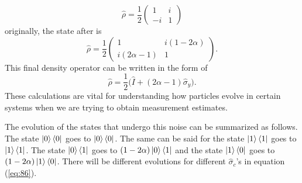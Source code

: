 \documentclass[twocolumn]{article}
\begin{document}
\begin{equation} \label{eq:90}
\hat{\rho}=\frac{1}{2}
\begin{pmatrix}
1 & i \\
-i & 1
\end{pmatrix}
\end{equation}
originally, the state after is
\begin{equation} \label{eq:91}
\hat{\rho}=\frac{1}{2}
\begin{pmatrix}
1 & i(1-2\alpha) \\
i(2\alpha-1) & 1
\end{pmatrix}.
\end{equation}
This final density operator can be written in the form of 
\begin{equation} \label{eq:92}
\hat{\rho}=\frac{1}{2}\big(\hat{I}+(2\alpha-1)\hat{\sigma}_y\big).
\end{equation}
These calculations are vital for understanding how particles evolve in certain systems when we are trying to obtain measurement estimates. 

The evolution of the states that undergo this noise can be summarized as follows. The state $\ket{0}\bra{0}$ goes to $\ket{0}\bra{0}$. The same can be said for the state $\ket{1}\bra{1}$ goes to $\ket{1}\bra{1}$. The state $\ket{0}\bra{1}$ goes to $(1-2\alpha)\ket{0}\bra{1}$ and the state $\ket{1}\bra{0}$ goes to $(1-2\alpha)\ket{1}\bra{0}$. There will be different evolutions for different $\hat{\sigma}_c$'s in equation (\ref{eq:86}).
\end{document}
